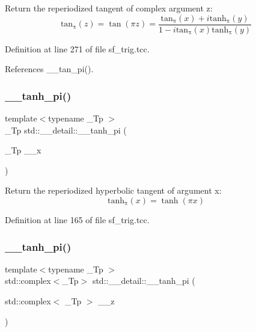 Return the reperiodized tangent of complex argument z\+: \[ \mathrm{tan_\pi}(z) = \tan(\pi z) = \frac{\mathrm{tan_\pi}(x) + i \mathrm{tanh_\pi}(y)} {1 - i \mathrm{tan_\pi}(x) \mathrm{tanh_\pi}(y)} \] 

Definition at line 271 of file sf\+\_\+trig.\+tcc.



References \+\_\+\+\_\+tan\+\_\+pi().

\mbox{\label{namespacestd_1_1____detail_ab0c02d3c15b8297df52b74807f22169b}} 
\subsubsection{\texorpdfstring{\+\_\+\+\_\+tanh\+\_\+pi()}{\_\_tanh\_pi()}\hspace{0.1cm}{\footnotesize\ttfamily [1/2]}}
{\footnotesize\ttfamily template$<$typename \+\_\+\+Tp $>$ \\
\+\_\+\+Tp std\+::\+\_\+\+\_\+detail\+::\+\_\+\+\_\+tanh\+\_\+pi (\begin{DoxyParamCaption}\item[{\+\_\+\+Tp}]{\+\_\+\+\_\+x }\end{DoxyParamCaption})}

Return the reperiodized hyperbolic tangent of argument x\+: \[ \mathrm{tanh_\pi}(x) = \tanh(\pi x) \] 

Definition at line 165 of file sf\+\_\+trig.\+tcc.

\mbox{\label{namespacestd_1_1____detail_a75775747d40813d5d54c0b7a7d0c39f0}} 
\subsubsection{\texorpdfstring{\+\_\+\+\_\+tanh\+\_\+pi()}{\_\_tanh\_pi()}\hspace{0.1cm}{\footnotesize\ttfamily [2/2]}}
{\footnotesize\ttfamily template$<$typename \+\_\+\+Tp $>$ \\
std\+::complex$<$\+\_\+\+Tp$>$ std\+::\+\_\+\+\_\+detail\+::\+\_\+\+\_\+tanh\+\_\+pi (\begin{DoxyParamCaption}\item[{std\+::complex$<$ \+\_\+\+Tp $>$}]{\+\_\+\+\_\+z }\end{DoxyParamCaption})}

